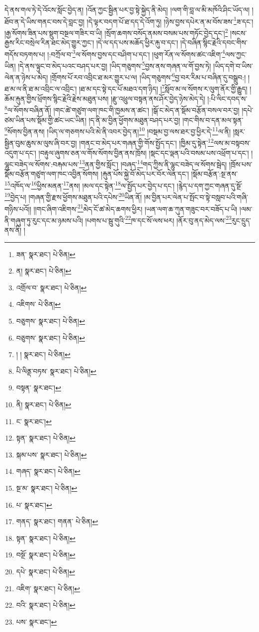 དེ་ནས་གལ་ཏེ་དེ་འོངས་སློང་བྱེད་ན། །འོན་ཀྱང་སྦྱིན་པར་བྱ་སྟེ་སྐྱེད་ནི་མེད། །ལག་གི་བླ་ལ་མི་མཁོའི་ཤིང་ཡོད་ལ། །ཐོབ་ན་དེ་ཡིས་གནང་བས་དེ་བླང་བྱ། །དེ་ལྟར་བདག་པོ་ཐ་དད་དེ་འོག་ཏུ། །ཉེས་བྱས་དཔེར་ན་མ་བོས་ཟས་\footnote{ཟན་  སྣར་ཐང་།  པེ་ཅིན། }ཟ་དང་། །རྒྱ་སོགས་ཟིན་པས་སྡུག་བསྔལ་གཟིར་བ་ཡི། །སྲོག་ཆགས་བསོད་ནམས་བསམ་པས་གཏོང་བྱེད་དང་།\footnote{ན།  སྣར་ཐང་།  པེ་ཅིན། } །སངས་རྒྱས་རིང་བསྲེལ་རིན་ཐང་མེད་གྱུར་ཀྱང་། །དེ་ལ་དད་པས་མཆོད་ཕྱིར་རྐུ་བ་དང་། །དེ་བཞིན་སྙིང་རྗེའི་དབང་གིས་གདོས་བཏགས་པ། །:བཀྲོལ་བ་\footnote{འགྲོལ་བ་  སྣར་ཐང་།  པེ་ཅིན། }ལ་སོགས་བྱས་དང་བཤིག་པ་དང་། །ཕུག་རོན་ལ་སོགས་ཚང་འཇིག་\footnote{འཇིགས་  པེ་ཅིན། }ལས་ཀྱང་ཡིན། །དེ་ནས་ལྟུང་བ་མེད་པའང་བཤད་པར་བྱ། །ཡིད་གཅུགས་\footnote{བཅུགས་  སྣར་ཐང་།  པེ་ཅིན། }བྱས་ནས་གཞན་ལ་གོ་བྱས་ཏེ། །ཡིད་དགེ་བ་ཡིས་ལེན་ན་ཉེས་པ་མེད། །གྲོགས་པོ་རབ་འབྲིང་ཐ་མར་གྱུར་པ་ལ། །ཡིད་གཅུགས་\footnote{བཅུགས་  སྣར་ཐང་།  པེ་ཅིན། }བྱ་བར་རིམ་པ་བཞིན་དུ་བསྒྲུབ:། །ཐ་མ་ལ་ནི་ཐ་མ་འབྲིང་ལ་འབྲིང་། །ཐ་མ་དང་སྟེ་དང་པོ་མཐའ་དག་ཉིད། །\footnote{། །  སྣར་ཐང་།  པེ་ཅིན། }སློབ་མ་ལ་སོགས་ར་ལུག་ནོར་གྱི་རྒྱུད། །ཆོམ་རྐུན་གྱིས་ཕྲོགས་སྙིང་རྗེའི་རྗེས་མཐུན་པས། །རྫུ་འཕྲུལ་བསྟན་ནས་ཤོར་བྱེད་ཉེས་མེད་དེ། །:པི་ལིང་དབད་ས་\footnote{པི་ལིནྡ་བཏས་  སྣར་ཐང་།  པེ་ཅིན། }ལ་སོགས་བཞིན་ནོ། །གང་ཚེ་གཙུག་ལག་ཁང་གི་ཁྱམས་ན་ཚང་། །སྒོ་ང་མེད་ན་སྡོམ་བརྩོན་བསལ་བར་བྱ། །དཔེ་ཙམ་ཡིན་པས་སྡོམ་གྱི་ཚང་ཡང་ཡིན། །ད་ནི་མ་བྱིན་ཕྱོགས་མཐུན་བཤད་པར་བྱ། །གང་གིས་བ་དན་མལ་སྟན་\footnote{བསྟན་  སྣར་ཐང་། }སོགས་བྱིན་ནས། །ཡིད་ལ་གཅགས་པའི་མེ་ནི་འབར་བྱེད་ན།\footnote{ནི།  སྣར་ཐང་།  པེ་ཅིན། } །བསྡམ་བྱ་ལས་ཐར་བྱ་ཕྱིར་དེ་\footnote{ང་  སྣར་ཐང་། }ལ་ནི། །སླར་སྦྱིན་བུམ་ཆུས་མ་ལུས་ཞི་བར་བྱ། །གནང་བ་མེད་པར་གཞན་གྱི་གོས་སྤྱོད་དང་། །ཁྱིམ་དུ་སྟེན་\footnote{སྟན་  སྣར་ཐང་།  པེ་ཅིན། }ལས་མ་བསྟབས་འདུག་པ་དང་། །བརྟུལ་ཞུགས་ཅན་ལ་གོས་སོགས་བྱིན་ནས་ཁྲོས། །སྡང་དང་ལྡན་པའི་བསམ་པས་འཕྲོག་པ་དང་། །ལྷུང་བཟེད་ལ་སོགས་:བརྐམ་པས་\footnote{སྐམ་པས་  སྣར་ཐང་།  པེ་ཅིན། }ནན་གྱིས་སློང་། །བཞད་\footnote{གཞད་  སྣར་ཐང་།  པེ་ཅིན། }གད་ཀྱིས་ནི་ལྷུང་བཟེད་ལ་སོགས་སྦེད། །ཁྲོས་པས་སྡོམ་བརྩོན་གཙུག་ལག་ཁང་འབྱིན་སོགས། །རྐུན་པོས་སྐྱེ་བོ་མེད་པར་བོར་ལེན་དང་། །སྡོམ་བརྩོན་:སྔ་ནས་\footnote{སྔ་མ་  སྣར་ཐང་།  པེ་ཅིན། }འཁོད་ལ་\footnote{པ་  སྣར་ཐང་། }ཕྱིས་མནན་\footnote{གནད་  སྣར་ཐང་། གནན་  པེ་ཅིན། }ནས། །མལ་དང་སྟེན་\footnote{སྟན་  སྣར་ཐང་།  པེ་ཅིན། }ལ་སྤྱོད་པར་བྱེད་པ་དང་། །རྙེད་པ་དག་ཀྱང་གཞན་དུ་སྔོ་\footnote{བསྔོ་  སྣར་ཐང་།  པེ་ཅིན། }བྱེད་པ། །གཞན་གྱི་རྫས་ཕྱོགས་མཐུན་པའི་དཔེས་\footnote{དཔེ་  སྣར་ཐང་།  པེ་ཅིན། }ཡིན་ནོ། །མ་བྱིན་པར་ལེན་པ་སྤོང་བ་སྟེ་བསླབ་པའི་གཞི་གཉིས་པའོ།། །།གང་ཞིག་འཇིགས་\footnote{འཇིག་  སྣར་ཐང་།  པེ་ཅིན། }མེད་ངོ་ཚ་མེད་ཆགས་ཕྱིར། །ཡན་ལག་ཆ་ཀུན་གཟུང་བར་བཟོད་པ་ཡི། །ལམ་ནི་གཞུག་ཏུ་རུང་དང་མ་ཉམས་པའི། །པགས་པ་སྦུ་གུའི་\footnote{བའི་  སྣར་ཐང་།  པེ་ཅིན། }ཁ་དང་སོ་ལས་ཕར། །ནོར་བུ་ནད་མེད་ལས་\footnote{པས་  སྣར་ཐང་། }རུང་དྲུད་ནས་ནི། །
